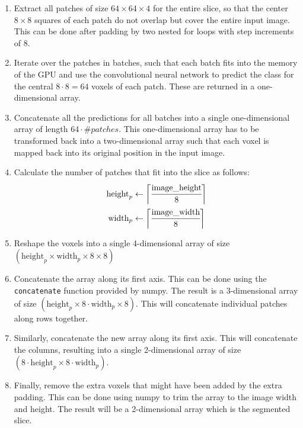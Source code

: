 \documentclass[12pt,a4paper,twoside,openright]{report}
\begin{document}
\begin{enumerate}
	\item Extract all patches of size $64 \times 64 \times 4$ for the entire slice, so that the center $8 \times 8$ squares of each patch do not overlap but cover the entire input image. This can be done after padding by two nested for loops with step increments of 8.
	\item Iterate over the patches in batches, such that each batch fits into the memory of the GPU and use the convolutional neural network to predict the class for the central $8 \cdot 8 = 64$ voxels of each patch. These are returned in a one-dimensional array.
	\item Concatenate all the predictions for all batches into a single one-dimensional array of length $64 \cdot \#patches$. This one-dimensional array has to be transformed back into a two-dimensional array such that each voxel is mapped back into its original position in the input image.
	\item Calculate the number of patches that fit into the slice as follows:
		\begin{equation}
		\begin{split}
			\text{height}_p & \gets \bigg \lceil \cfrac{\text{image\_height}}{8} \bigg \rceil 	 \\
			\text{width}_p & \gets \bigg \lceil \cfrac{\text{image\_width}}{8} \bigg \rceil 	 \\
		\end{split}		
		\end{equation}
	\item Reshape the voxels into a single 4-dimensional array of size $(\text{height}_p \times \text{width}_p \times 8 \times 8)$
	\item Concatenate the array along its first axis. This can be done using the \texttt{concatenate} function provided by numpy. The result is a 3-dimensional array of size $(\text{height}_p \times 8 \cdot \text{width}_p \times 8)$. This will concatenate individual patches along rows together.
	\item Similarly, concatenate the new array along its first axis. This will concatenate the columns, resulting into a single 2-dimensional array of size $(8 \cdot \text{height}_p \times 8 \cdot \text{width}_p)$.
	\item Finally, remove the extra voxels that might have been added by the extra padding. This can be done using numpy to trim the array to the image width and height. The result will be a 2-dimensional array which is the segmented slice.
\end{enumerate}
\end{document}
